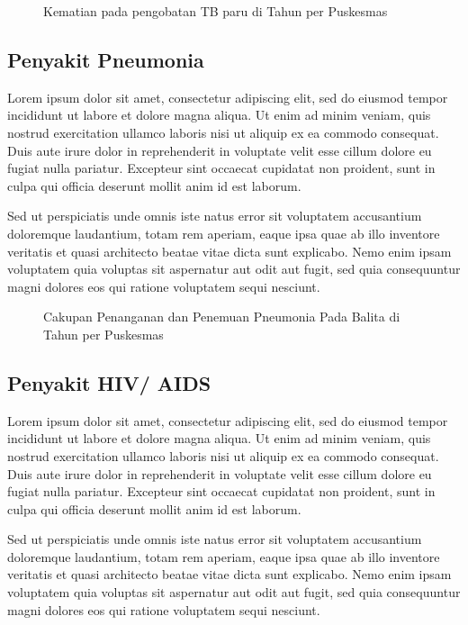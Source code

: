 \begin{figure}[H]
	\centering
	\caption{Kematian pada pengobatan TB paru di \namaKabupaten Tahun \tP per Puskesmas}
	\label{fig:kematian-TB}
\end{figure}

\subsection{Penyakit Pneumonia}
Lorem ipsum dolor sit amet, consectetur adipiscing elit, sed do eiusmod tempor incididunt ut labore et dolore magna aliqua. Ut enim ad minim veniam, quis nostrud exercitation ullamco laboris nisi ut aliquip ex ea commodo consequat. Duis aute irure dolor in reprehenderit in voluptate velit esse cillum dolore eu fugiat nulla pariatur. Excepteur sint occaecat cupidatat non proident, sunt in culpa qui officia deserunt mollit anim id est laborum.

Sed ut perspiciatis unde omnis iste natus error sit voluptatem accusantium doloremque laudantium, totam rem aperiam, eaque ipsa quae ab illo inventore veritatis et quasi architecto beatae vitae dicta sunt explicabo. Nemo enim ipsam voluptatem quia voluptas sit aspernatur aut odit aut fugit, sed quia consequuntur magni dolores eos qui ratione voluptatem sequi nesciunt.

\begin{figure}[H]
	\centering
	\caption{Cakupan Penanganan dan Penemuan Pneumonia Pada Balita di \namaKabupaten Tahun \tP per Puskesmas}
	\label{fig:Penemuan-Pneumonia-Balita}
\end{figure}

\subsection{Penyakit HIV/ AIDS}
Lorem ipsum dolor sit amet, consectetur adipiscing elit, sed do eiusmod tempor incididunt ut labore et dolore magna aliqua. Ut enim ad minim veniam, quis nostrud exercitation ullamco laboris nisi ut aliquip ex ea commodo consequat. Duis aute irure dolor in reprehenderit in voluptate velit esse cillum dolore eu fugiat nulla pariatur. Excepteur sint occaecat cupidatat non proident, sunt in culpa qui officia deserunt mollit anim id est laborum.

Sed ut perspiciatis unde omnis iste natus error sit voluptatem accusantium doloremque laudantium, totam rem aperiam, eaque ipsa quae ab illo inventore veritatis et quasi architecto beatae vitae dicta sunt explicabo. Nemo enim ipsam voluptatem quia voluptas sit aspernatur aut odit aut fugit, sed quia consequuntur magni dolores eos qui ratione voluptatem sequi nesciunt.

